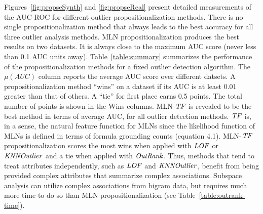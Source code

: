 		Figures~\ref{fig:propseSynth} and \ref{fig:propseReal} present detailed measurements of the AUC-ROC for different outlier propositionalization methods. There is no single propositionalization method that always leads to the best accuracy for all three outlier analysis methods. MLN propositionalization produces the best results on two datasets. It is always close to the maximum AUC score (never less than 0.1 AUC units away). Table~\ref{table:summary} summarizes the performance of the propositionalization methods for a fixed outlier detection algorithm. The $\mu(AUC)$ column reports the average AUC score over different datsets. A propositionalization method ``wins'' on a dataset if its AUC is at least 0.01 greater than that of others. A ``tie'' for first place earns 0.5 points. The total number of points is shown in the Wins columns. MLN-$\it{TF}$ is revealed to be the best method in terms of average AUC, for all outlier detection methods. $\it{TF}$ is, in a sense, the natural feature function for MLNs since the likelihood function of MLNs is defined in terms of formula grounding counts (equation 4.1). 		
		MLN-$\it{TF}$ propositionalization scores the most wins when applied with $\it{LOF}$ or $\it{KNNOutlier}$ and a tie when applied with $\it{OutRank}$. Thus, methods that tend to treat attributes independently, such as $\it{LOF}$ and $\it{KNNOutlier}$, benefit from being provided complex attributes that summarize complex associations. Subspace analysis can utilize complex associations from bigram data, but requires much more time to do so than MLN propositionalization (see Table~\ref{table:outrank-time}).
		
